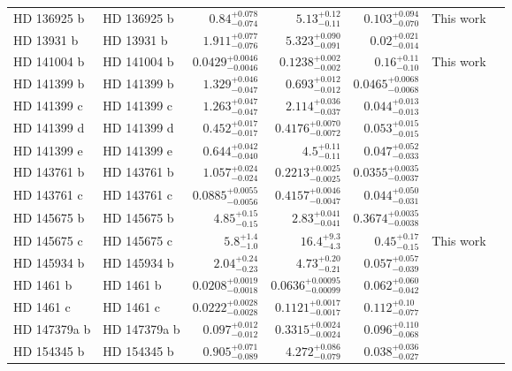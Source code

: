 \begin{longtable*}{llrrrrr}
HD 136925 b & HD 136925 b & $0.84^{+0.078}_{-0.074}$ & $5.13^{+0.12}_{-0.11}$ & $0.103^{+0.094}_{-0.070}$ & This work & \\ 
HD 13931 b & HD 13931 b & $1.911^{+0.077}_{-0.076}$ & $5.323^{+0.090}_{-0.091}$ & $0.02^{+0.021}_{-0.014}$ & \cite{Howard10} & \\ 
HD 141004 b & HD 141004 b & $0.0429^{+0.0046}_{-0.0046}$ & $0.1238^{+0.002}_{-0.002}$ & $0.16^{+0.11}_{-0.10}$ & This work & \\ 
HD 141399 b & HD 141399 b & $1.329^{+0.046}_{-0.047}$ & $0.693^{+0.012}_{-0.012}$ & $0.0465^{+0.0068}_{-0.0068}$ & \cite{Vogt14} & \\ 
HD 141399 c & HD 141399 c & $1.263^{+0.047}_{-0.047}$ & $2.114^{+0.036}_{-0.037}$ & $0.044^{+0.013}_{-0.013}$ & \cite{Vogt14} & \\ 
HD 141399 d & HD 141399 d & $0.452^{+0.017}_{-0.017}$ & $0.4176^{+0.0070}_{-0.0072}$ & $0.053^{+0.015}_{-0.015}$ & \cite{Vogt14} & \\ 
HD 141399 e & HD 141399 e & $0.644^{+0.042}_{-0.040}$ & $4.5^{+0.11}_{-0.11}$ & $0.047^{+0.052}_{-0.033}$ & \cite{Vogt14} & \\ 
HD 143761 b & HD 143761 b & $1.057^{+0.024}_{-0.024}$ & $0.2213^{+0.0025}_{-0.0025}$ & $0.0355^{+0.0035}_{-0.0037}$ & \cite{Noyes97} & \\ 
HD 143761 c & HD 143761 c & $0.0885^{+0.0055}_{-0.0056}$ & $0.4157^{+0.0046}_{-0.0047}$ & $0.044^{+0.050}_{-0.031}$ & \cite{Fulton16} & \\ 
HD 145675 b & HD 145675 b & $4.85^{+0.15}_{-0.15}$ & $2.83^{+0.041}_{-0.041}$ & $0.3674^{+0.0035}_{-0.0038}$ & \cite{Wittenmyer07} & \\ 
HD 145675 c & HD 145675 c & $5.8^{+1.4}_{-1.0}$ & $16.4^{+9.3}_{-4.3}$ & $0.45^{+0.17}_{-0.15}$ & This work & \\ 
HD 145934 b & HD 145934 b & $2.04^{+0.24}_{-0.23}$ & $4.73^{+0.20}_{-0.21}$ & $0.057^{+0.057}_{-0.039}$ & \cite{Feng15} & \\ 
HD 1461 b & HD 1461 b & $0.0208^{+0.0019}_{-0.0018}$ & $0.0636^{+0.00095}_{-0.00099}$ & $0.062^{+0.060}_{-0.042}$ & \cite{Rivera10} & \\ 
HD 1461 c & HD 1461 c & $0.0222^{+0.0028}_{-0.0028}$ & $0.1121^{+0.0017}_{-0.0017}$ & $0.112^{+0.10}_{-0.077}$ & \cite{Diaz16} & \\ 
HD 147379a b & HD 147379a b & $0.097^{+0.012}_{-0.012}$ & $0.3315^{+0.0024}_{-0.0024}$ & $0.096^{+0.110}_{-0.068}$ & \cite{Reiners18} & \\ 
HD 154345 b & HD 154345 b & $0.905^{+0.071}_{-0.089}$ & $4.272^{+0.086}_{-0.079}$ & $0.038^{+0.036}_{-0.027}$ & \cite{Wright08} & \\ 

\end{longtable*}
